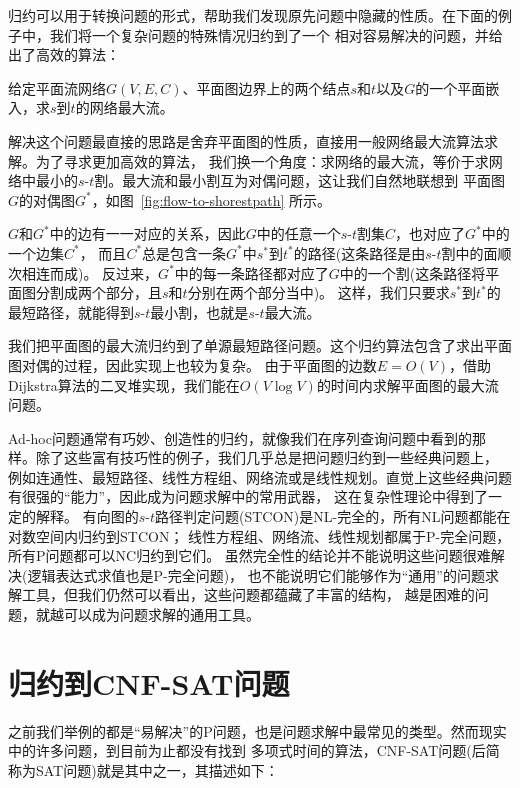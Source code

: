 归约可以用于转换问题的形式，帮助我们发现原先问题中隐藏的性质。在下面的例子中，我们将一个复杂问题的特殊情况归约到了一个
相对容易解决的问题，并给出了高效的算法：

\begin{prob}[平面图最大流]
 给定平面流网络$G(V, E, C)$、平面图边界上的两个结点$s$和$t$以及$G$的一个平面嵌入，求$s$到$t$的网络最大流。
\end{prob}
\begin{solution}
解决这个问题最直接的思路是舍弃平面图的性质，直接用一般网络最大流算法求解。为了寻求更加高效的算法，
我们换一个角度：求网络的最大流，等价于求网络中最小的$s$-$t$割。最大流和最小割互为对偶问题，这让我们自然地联想到
平面图$G$的对偶图$G^*$，如图~\ref{fig:flow-to-shorestpath} 所示。



$G$和$G^*$中的边有一一对应的关系，因此$G$中的任意一个$s$-$t$割集$C$，也对应了$G^*$中的一个边集$C^*$，
而且$C^*$总是包含一条$G^*$中$s^*$到$t^*$的路径(这条路径是由$s$-$t$割中的面顺次相连而成)。
反过来，$G^*$中的每一条路径都对应了$G$中的一个割(这条路径将平面图分割成两个部分，且$s$和$t$分别在两个部分当中)。
这样，我们只要求$s^*$到$t^*$的最短路径，就能得到$s$-$t$最小割，也就是$s$-$t$最大流。

我们把平面图的最大流归约到了单源最短路径问题。这个归约算法包含了求出平面图对偶的过程，因此实现上也较为复杂。
由于平面图的边数$E=O(V)$，借助Dijkstra算法的二叉堆实现，我们能在$O(V\log V)$的时间内求解平面图的最大流问题。
\end{solution}

Ad-hoc问题通常有巧妙、创造性的归约，就像我们在序列查询问题中看到的那样。除了这些富有技巧性的例子，我们几乎总是把问题归约到一些经典问题上，
例如连通性、最短路径、线性方程组、网络流或是线性规划。直觉上这些经典问题有很强的``能力''，因此成为问题求解中的常用武器，
这在复杂性理论中得到了一定的解释。
有向图的$s$-$t$路径判定问题(STCON)是NL-完全的，所有NL问题都能在对数空间内归约到STCON；
线性方程组、网络流、线性规划都属于P-完全问题，所有P问题都可以NC归约到它们。
虽然完全性的结论并不能说明这些问题很难解决(逻辑表达式求值也是P-完全问题)，
也不能说明它们能够作为``通用''的问题求解工具，但我们仍然可以看出，这些问题都蕴藏了丰富的结构，
越是困难的问题，就越可以成为问题求解的通用工具。


\section{归约到CNF-SAT问题}

之前我们举例的都是``易解决''的P问题，也是问题求解中最常见的类型。然而现实中的许多问题，到目前为止都没有找到
多项式时间的算法，CNF-SAT问题(后简称为SAT问题)就是其中之一，其描述如下：

